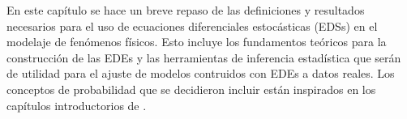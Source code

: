 En este capítulo se hace un breve repaso de las definiciones
y resultados necesarios para el uso de ecuaciones diferenciales 
estocásticas (EDSs) en el modelaje de fenómenos físicos. Esto 
incluye los fundamentos teóricos para la construcción de las EDEs 
y las herramientas de inferencia estadística que serán de 
utilidad para el ajuste de modelos contruidos con EDEs a datos 
reales. Los conceptos de probabilidad que se decidieron incluir 
están inspirados en los capítulos introductorios de 
\textcite{
arnoldStochasticDifferentialEquations1974,
oksendalStochasticDifferentialEquations2003,
maoStochasticDifferentialEquations2011,
rinconIntroduccionProcesosEstocasticos2012, 
dobrowIntroductionStochasticProcesses2016}. 




